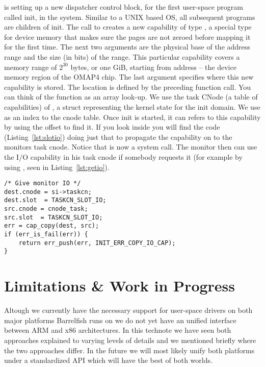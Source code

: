 \documentclass[a4paper,11pt,twoside]{report}
\begin{document}
 is setting up a new dispatcher control block, for
the first user-space program called init, in the system. Similar to a UNIX
based OS, all subsequent programs are children of init. The call to
 creates a new capability of type
, a special type for device memory that makes sure
the pages are not zeroed before mapping it for the first time. The next two
arguments are the physical base of the address range and the size (in bits) of
the range. This particular capability covers a memory range of $2^{30}$ bytes,
or one GiB, starting from address  -- the device memory
region of the OMAP4 chip. The last argument specifies where this new
capability is stored. The location is defined by the preceding
 function call. You can think of the
 function as an array look-up. We use the task
CNode (a table of capabilities) of , a struct
representing the kernel state for the init domain. We use
  as an index to the cnode table. Once init is
started, it can refers to this capability by using the 
offset to find it. If you look inside  you will
find the code (Listing~\ref{lst:slotio}) doing just that to propagate the capability on to the monitors task cnode. Notice that  is
now a system call. The monitor then can use the I/O capability in
his task cnode if somebody requests it (for example by using ,
seen in Listing~\ref{lst:getio}).

\begin{lstlisting}[caption={Copy of the I/O capability from
    \varname{src} to \varname{dest}.}, label={lst:slotio}]
/* Give monitor IO */
dest.cnode = si->taskcn;
dest.slot  = TASKCN_SLOT_IO;
src.cnode = cnode_task;
src.slot  = TASKCN_SLOT_IO;
err = cap_copy(dest, src);
if (err_is_fail(err)) {
    return err_push(err, INIT_ERR_COPY_IO_CAP);
}
\end{lstlisting}

\chapter{Limitations \& Work in Progress}

Altough we currently have the necessary support for user-space drivers
on both major platforms Barrelfish runs on we do not yet have an
unified interface between ARM and x86 architectures. In this technote
we have seen both approaches explained to varying levels of details and
we mentioned briefly where the two approaches differ. In the future we will
most likely unify both platforms under a standardized API which will have
the best of both worlds.



\end{document}
